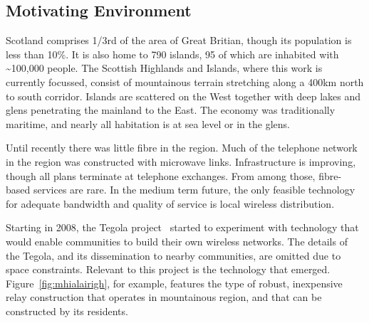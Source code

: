 \subsection{Motivating Environment}

Scotland comprises 1/3rd of the area of Great Britian, though its population is
less than 10\%. It is also home to 790 islands, 95 of which are inhabited with
\textasciitilde 100,000 people. The Scottish Highlands and Islands, where this
work is currently focussed, consist of mountainous terrain stretching along a
400km north to south corridor. Islands are scattered on the West together with
deep lakes and glens penetrating the mainland to the East.  The economy was
traditionally maritime, and nearly all habitation is at sea level or in the
glens.

Until recently there was little fibre in the region.  Much of the telephone
network in the region was constructed with microwave links. Infrastructure is
improving, though all plans terminate at telephone exchanges. From among those,
fibre-based services are rare. In the medium term future, the only feasible
technology for adequate bandwidth and quality of service is local wireless
distribution.

Starting in 2008, the Tegola project~\cite{tegola} started to
experiment with technology that would enable communities to build
their own wireless networks.
The details of the Tegola, and its dissemination to nearby communities, are
omitted due to space constraints. Relevant to this project is the technology
that emerged. Figure~\ref{fig:mhialairigh}, for example, features the type of
robust, inexpensive relay construction that operates in mountainous region, and
that can be constructed by its residents.

